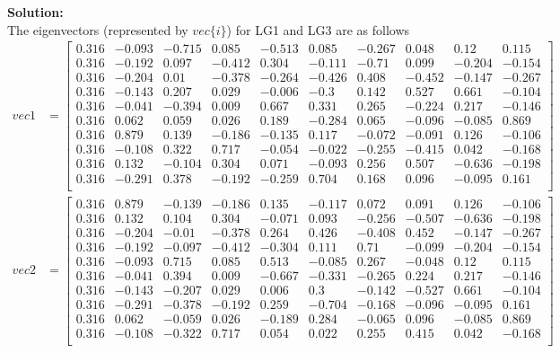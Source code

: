 \documentclass[12pt,a4paper]{article}
\newcommand{\solution}{\noindent\textbf{Solution:}\\}
\begin{document}
\solution
The eigenvectors (represented by $vec\{i\}$) for LG1 and LG3 are as follows
\begin{align*}
    vec1 &= 
    \begin{bmatrix}
        0.316& -0.093& -0.715&  0.085& -0.513&  0.085& -0.267&  0.048& 0.12 &  0.115 \\
        0.316& -0.192&  0.097& -0.412&  0.304& -0.111& -0.71 &  0.099& -0.204& -0.154 \\
        0.316& -0.204&  0.01 & -0.378& -0.264& -0.426&  0.408& -0.452& -0.147& -0.267 \\
        0.316& -0.143&  0.207&  0.029& -0.006& -0.3  &  0.142&  0.527& 0.661& -0.104 \\
        0.316& -0.041& -0.394&  0.009&  0.667&  0.331&  0.265& -0.224& 0.217& -0.146 \\
        0.316&  0.062&  0.059&  0.026&  0.189& -0.284&  0.065& -0.096& -0.085&  0.869 \\
        0.316&  0.879&  0.139& -0.186& -0.135&  0.117& -0.072& -0.091& 0.126& -0.106 \\
        0.316& -0.108&  0.322&  0.717& -0.054& -0.022& -0.255& -0.415& 0.042& -0.168 \\
        0.316&  0.132& -0.104&  0.304&  0.071& -0.093&  0.256&  0.507& -0.636& -0.198 \\
        0.316& -0.291&  0.378& -0.192& -0.259&  0.704&  0.168&  0.096& -0.095&  0.161 \\
    \end{bmatrix} \\
    vec2 &=
    \begin{bmatrix}
        0.316&  0.879& -0.139& -0.186&  0.135& -0.117&  0.072&  0.091& 0.126& -0.106\\
        0.316&  0.132&  0.104&  0.304& -0.071&  0.093& -0.256& -0.507& -0.636& -0.198\\
        0.316& -0.204& -0.01 & -0.378&  0.264&  0.426& -0.408&  0.452& -0.147& -0.267\\
        0.316& -0.192& -0.097& -0.412& -0.304&  0.111&  0.71 & -0.099& -0.204& -0.154\\
        0.316& -0.093&  0.715&  0.085&  0.513& -0.085&  0.267& -0.048& 0.12 &  0.115\\
        0.316& -0.041&  0.394&  0.009& -0.667& -0.331& -0.265&  0.224& 0.217& -0.146\\
        0.316& -0.143& -0.207&  0.029&  0.006&  0.3  & -0.142& -0.527& 0.661& -0.104\\
        0.316& -0.291& -0.378& -0.192&  0.259& -0.704& -0.168& -0.096& -0.095&  0.161\\
        0.316&  0.062& -0.059&  0.026& -0.189&  0.284& -0.065&  0.096& -0.085&  0.869\\
        0.316& -0.108& -0.322&  0.717&  0.054&  0.022&  0.255&  0.415& 0.042& -0.168 \\
    \end{bmatrix}
\end{align*}
\end{document}
